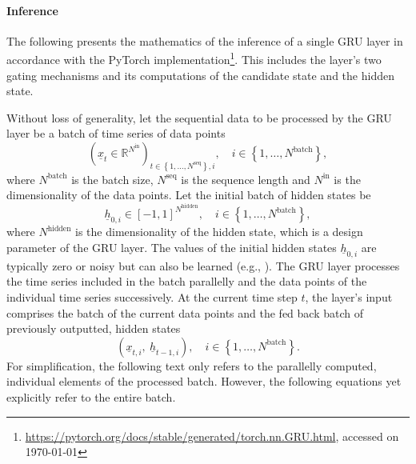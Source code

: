 \paragraph*{Inference}$\ $\\
The following presents the mathematics 
of the inference
of a single GRU layer
in accordance with the PyTorch implementation\footnote{
    \url{https://pytorch.org/docs/stable/generated/torch.nn.GRU.html}, accessed on \today
}.
This includes the layer's two gating mechanisms
and its computations of the candidate state and the hidden state.






Without loss of generality,
let the sequential data to be processed by the GRU layer
be a batch of time series of data points
\begin{equation}
    \left(
        \underline x_t
        \in \mathbb{R}^{N^\text{in}}
    \right)_{
        t \in \left\{
            1, \dots, N^\text{seq}
        \right\}
        ,
        i
    }
    ,\quad
    i \in \left\{
        1, \dots, N^\text{batch}
    \right\},
\end{equation}
where $N^\text{batch}$ is the batch size, 
$N^\text{seq}$ is the sequence length 
and $N^\text{in}$ is the dimensionality of the data points.
Let the initial batch of hidden states be
\begin{equation} \label{eq:gru_init_hidden_state}
    \underline h_{0,i}
    \in \left[-1, 1\right]^{N^\text{hidden}}
    ,\quad
    i \in \left\{
        1, \dots, N^\text{batch}
    \right\},
\end{equation}
where $N^\text{hidden}$ is the dimensionality
of the hidden state, which is a design parameter of the GRU layer.
The values of the initial hidden states $\underline h_{0,i}$
are typically zero or noisy \cite{Zimmermann2012}
but can also be learned (e.g., \cite{Forcada1995}).
The GRU layer processes the time series included in the batch parallelly 
and the data points of the individual time series successively.
At the current time step $t$,
the layer's input comprises 
the batch of the current data points
and the fed back batch of previously outputted, hidden states
\begin{equation}
    \left(
    \underline x_{t,i}
    ,\ 
    \underline h_{t-1,i}
    \right)
    ,\quad
    i \in \left\{
        1, \dots, N^\text{batch}
    \right\}.
\end{equation}
For simplification, the following text only refers 
to the parallelly computed, individual elements of the processed batch. 
However, the following equations yet explicitly refer to the entire batch.


